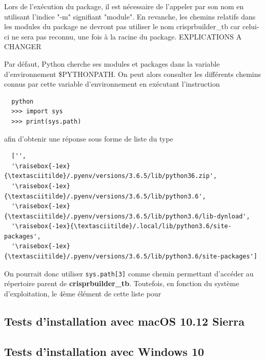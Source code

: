 \documentclass[twoside,a4paper,11pt,frenchb,openany]{report}
\begin{document}
Lors de l'exécution du package, il est nécessaire de l'appeler par son nom en utilisant l'indice "-m" signifiant "module".  En revanche, les chemins relatifs dans les modules du package ne devront pas utiliser le nom crisprbuilder\_tb car celui-ci ne sera pas reconnu, une fois à la racine du package. EXPLICATIONS A CHANGER

Par défaut, Python cherche ses modules et packages dans la variable d'environnement \$PYTHONPATH. On peut alors consulter les différents chemins connus par cette variable d'environnement en exécutant l'instruction
\begin{verbatim}  python
  >>> import sys
  >>> print(sys.path)\end{verbatim}

afin d'obtenir une réponse sous forme de liste du type
\begin{verbatim}  ['',
  '\raisebox{-1ex}{\textasciitilde}/.pyenv/versions/3.6.5/lib/python36.zip',
  '\raisebox{-1ex}{\textasciitilde}/.pyenv/versions/3.6.5/lib/python3.6',
  '\raisebox{-1ex}{\textasciitilde}/.pyenv/versions/3.6.5/lib/python3.6/lib-dynload',    
  '\raisebox{-1ex}{\textasciitilde}/.local/lib/python3.6/site-packages',
  '\raisebox{-1ex}{\textasciitilde}/.pyenv/versions/3.6.5/lib/python3.6/site-packages']\end{verbatim}

On pourrait donc utiliser \texttt{sys.path[3]} comme chemin permettant d'accéder au répertoire parent de \textbf{crisprbuilder\_tb}. Toutefois, en fonction du système d'exploitation,  le 4ème élément de cette liste pour











\subsection{Tests d'installation avec macOS 10.12 Sierra}








\subsection{Tests d'installation avec Windows 10}
\end{document}
